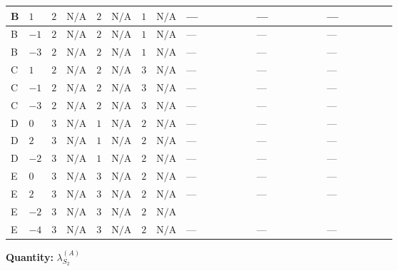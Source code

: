 \documentclass[8pt]{article}
\begin{document}
\begin{landscape}
\begin{longtable}{@{}llcccccc >{\raggedright\arraybackslash}p{0.21\linewidth} >{\raggedright\arraybackslash}p{0.21\linewidth} >{\raggedright\arraybackslash}p{0.21\linewidth}@{}}
\midrule
B & $1$ & $2$ & $\text{N/A}$ & $2$ & $\text{N/A}$ & $1$ & $\text{N/A}$ & --- & --- & --- \\
\midrule
B & $-1$ & $2$ & $\text{N/A}$ & $2$ & $\text{N/A}$ & $1$ & $\text{N/A}$ & --- & --- & --- \\
\midrule
B & $-3$ & $2$ & $\text{N/A}$ & $2$ & $\text{N/A}$ & $1$ & $\text{N/A}$ & --- & --- & --- \\
\midrule
C & $1$ & $2$ & $\text{N/A}$ & $2$ & $\text{N/A}$ & $3$ & $\text{N/A}$ & --- & --- & --- \\
\midrule
C & $-1$ & $2$ & $\text{N/A}$ & $2$ & $\text{N/A}$ & $3$ & $\text{N/A}$ & --- & --- & --- \\
\midrule
C & $-3$ & $2$ & $\text{N/A}$ & $2$ & $\text{N/A}$ & $3$ & $\text{N/A}$ & --- & --- & --- \\
\midrule
D & $0$ & $3$ & $\text{N/A}$ & $1$ & $\text{N/A}$ & $2$ & $\text{N/A}$ & --- & --- & --- \\
\midrule
D & $2$ & $3$ & $\text{N/A}$ & $1$ & $\text{N/A}$ & $2$ & $\text{N/A}$ & --- & --- & --- \\
\midrule
D & $-2$ & $3$ & $\text{N/A}$ & $1$ & $\text{N/A}$ & $2$ & $\text{N/A}$ & --- & --- & --- \\
\midrule
E & $0$ & $3$ & $\text{N/A}$ & $3$ & $\text{N/A}$ & $2$ & $\text{N/A}$ & --- & --- & --- \\
\midrule
E & $2$ & $3$ & $\text{N/A}$ & $3$ & $\text{N/A}$ & $2$ & $\text{N/A}$ & --- & --- & --- \\
\midrule
E & $-2$ & $3$ & $\text{N/A}$ & $3$ & $\text{N/A}$ & $2$ & $\text{N/A}$ & \scriptsize\adjustbox{max width=\linewidth}{$\begin{gathered} -\frac{224}{3} {\lambda_{X_{1}}} \left({\lambda_{X_{1}}}\right)^{*}\end{gathered}$} & \scriptsize\adjustbox{max width=\linewidth}{$\begin{gathered} -\frac{44}{3} {\lambda_{X_{2}}} \left({\lambda_{X_{2}}}\right)^{*}\end{gathered}$} & \scriptsize\adjustbox{max width=\linewidth}{$\begin{gathered} -\frac{4}{3} {\lambda_{X_{7}}^{(2)}} \left({\lambda_{X_{7}}^{(1)}}\right)^{*}\end{gathered}$} \\
\midrule
E & $-4$ & $3$ & $\text{N/A}$ & $3$ & $\text{N/A}$ & $2$ & $\text{N/A}$ & --- & --- & --- \\
\midrule
\bottomrule
\end{longtable}
\clearpage
\noindent\textbf{Quantity: }$\lambda_{S_2}^{(A)}$\par\smallskip

\end{landscape}
\end{document}
